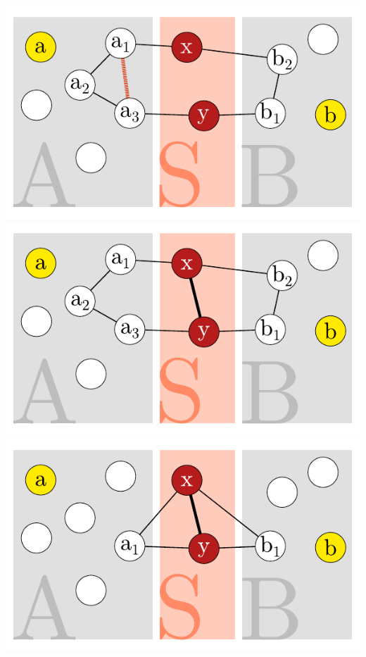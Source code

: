 \documentclass[xcolor=x11names,compress]{beamer}
\begin{document}
\begin{frame}
\begin{center}
\begin{overprint}
			\includegraphics[scale=1.0]{img/graph/nodeseparator/proof/04.pdf}
			\onslide<6>\includegraphics[scale=1.0]{img/graph/nodeseparator/proof/05.pdf}
			\onslide<7>\includegraphics[scale=1.0]{img/graph/nodeseparator/proof/06.pdf}
		\end{overprint}
	\end{center}
\end{frame}
\end{document}
